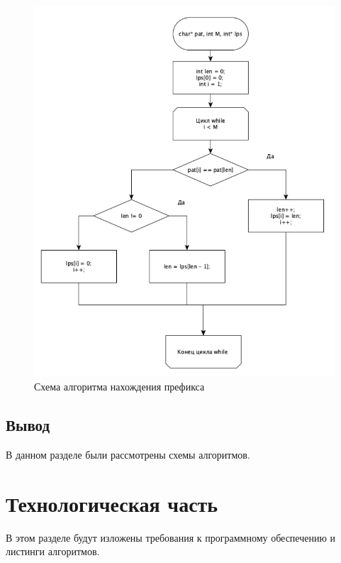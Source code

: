 \documentclass[a4paper, 14pt]{report}
\begin{document}
    \begin{figure}[H]
        	\begin{center}
        		\includegraphics[scale=0.9]{img/pref.png}
        		\caption{Схема алгоритма нахождения префикса}
        		\label{fig:pref}
        	\end{center}
        \end{figure}
       

	\section{Вывод}
	
	В данном разделе были рассмотрены схемы алгоритмов.

	\newpage
	\chapter{Технологическая часть}
	
	В этом разделе будут изложены требования к программному обеспечению и листинги алгоритмов.
	
\end{document}
